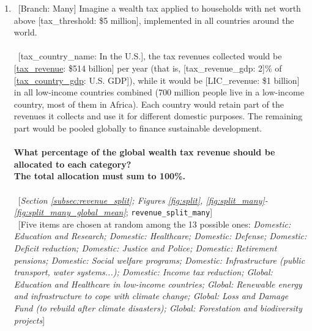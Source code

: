 \documentclass[12pt,english]{article}
\begin{document}
\begin{bibunit}
\begin{enumerate}[resume]
\item ~[Branch: Many] \label{q:revenue_split_many} Imagine a wealth tax applied to households with net worth above [tax\_threshold: \$5 million], implemented in all countries around the world.
~\\\\ 
~[tax\_country\_name: In the U.S.], the tax revenues collected would be [\hyperlink{tab_features}{tax\_revenue}: \$514 billion] per year (that is, [tax\_revenue\_gdp: 2]\% of [\hyperlink{tab_features}{tax\_country\_gdp}: U.S. GDP]), while it would be [LIC\_revenue: \$1 billion] in all low-income countries combined (700 million people live in a low-income country, most of them in Africa).
Each country would retain part of the revenues it collects and use it for different domestic purposes. The remaining part would be pooled globally to finance sustainable development.
~\\\\\textbf{What percentage of the global wealth tax revenue should be allocated to each category?}~\\\textbf{The total allocation must sum to
100\%.}\\\\ 
~[\textit{Section \ref{subsec:revenue_split}; Figures \ref{fig:split}, \ref{fig:split_many}-\ref{fig:split_many_global_mean}}; 
\verb|revenue_split_many|]
  \\ ~[Five items are chosen at random among the 13 possible ones: \textit{Domestic: Education and Research; Domestic: Healthcare; Domestic: Defense; Domestic: Deficit reduction; Domestic: Justice and Police; Domestic: Retirement pensions; Domestic: Social welfare programs; Domestic: Infrastructure (public transport, water systems...); Domestic: Income tax reduction; Global: Education and Healthcare in low-income countries; Global: Renewable energy and infrastructure to cope with climate change; Global: Loss and Damage Fund (to rebuild after climate disasters); Global: Forestation and biodiversity projects}]


\end{enumerate} 


\end{bibunit}
\end{document}

